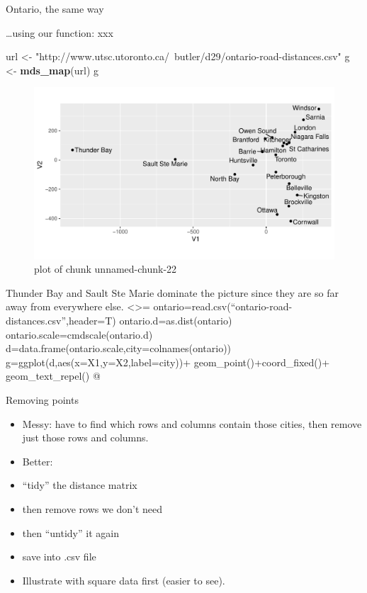 \documentclass[ignorenonframetext,]{beamer}
\newenvironment{Shaded}{\begin{snugshade}}{\end{snugshade}}
\newcommand{\KeywordTok}[1]{\textcolor[rgb]{0.13,0.29,0.53}{\textbf{#1}}}
\newcommand{\NormalTok}[1]{#1}
\newcommand{\StringTok}[1]{\textcolor[rgb]{0.31,0.60,0.02}{#1}}
\begin{document}
\begin{frame}[fragile]{Ontario, the same way}
\protect\hypertarget{ontario-the-same-way}{}

\ldots using our function: xxx

\begin{Shaded}
\begin{Highlighting}[]
\NormalTok{url <-}\StringTok{ }
\StringTok{  "http://www.utsc.utoronto.ca/~butler/d29/ontario-road-distances.csv"}
\NormalTok{g <-}\StringTok{ }\KeywordTok{mds_map}\NormalTok{(url)}
\NormalTok{g}
\end{Highlighting}
\end{Shaded}

\begin{figure}
\centering
\includegraphics{figure/unnamed-chunk-22-1.pdf}
\caption{plot of chunk unnamed-chunk-22}
\end{figure}

Thunder Bay and Sault Ste Marie dominate the picture since they are so
far away from everywhere else. \textless{}\textgreater{}=
ontario=read.csv(``ontario-road-distances.csv'',header=T)
ontario.d=as.dist(ontario) ontario.scale=cmdscale(ontario.d)
d=data.frame(ontario.scale,city=colnames(ontario))
g=ggplot(d,aes(x=X1,y=X2,label=city))+ geom\_point()+coord\_fixed()+
geom\_text\_repel() @

\end{frame}

\begin{frame}{Removing points}
\protect\hypertarget{removing-points}{}

\begin{itemize}
\item
  Messy: have to find which rows and columns contain those cities, then
  remove just those rows and columns.
\item
  Better:
\item
  ``tidy'' the distance matrix
\item
  then remove rows we don't need
\item
  then ``untidy'' it again
\item
  save into .csv file
\item
  Illustrate with square data first (easier to see).
\end{itemize}

\end{frame}
\end{document}
